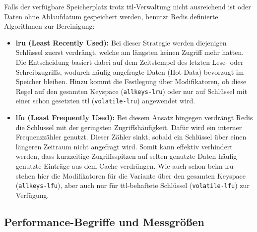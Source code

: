 Falls der verfügbare Speicherplatz trotz \ac{ttl}-Verwaltung nicht ausreichend ist oder Daten ohne Ablaufdatum gespeichert werden, benutzt Redis definierte Algorithmen zur Bereinigung:

\begin{itemize}
    \item \textbf{\ac{lru} (Least Recently Used):} Bei dieser Strategie werden diejenigen Schlüssel zuerst verdrängt, welche am längsten keinen Zugriff mehr hatten. Die Entscheidung basiert dabei auf dem Zeitstempel des letzten Lese- oder Schreibzugriffs, wodurch häufig angefragte Daten (\glqq{}Hot Data\grqq{}) bevorzugt im Speicher bleiben. Hinzu kommt die Festlegung über Modifikatoren, ob diese Regel auf den gesamten Keyspace (\texttt{allkeys-lru}) oder nur auf Schlüssel mit einer schon gesetzten \ac{ttl} (\texttt{volatile-lru}) angewendet wird.
    
    \item \textbf{\ac{lfu} (Least Frequently Used):} Bei diesem Ansatz hingegen verdrängt Redis die Schlüssel mit der geringsten Zugriffshäufigkeit. Dafür wird ein interner Frequenzzähler genutzt. Dieser Zähler sinkt, sobald ein Schlüssel über einen längeren Zeitraum nicht angefragt wird. Somit kann effektiv verhindert werden, dass kurzzeitige Zugriffsspitzen auf selten genutzte Daten häufig genutzte Einträge aus dem Cache verdrängen. Wie auch schon beim \ac{lru} stehen hier die Modifikatoren für die Variante über den gesamten Keyspace (\texttt{allkeys-lfu}), aber auch nur für \ac{ttl}-behaftete Schlüssel (\texttt{volatile-lfu}) zur Verfügung.
\end{itemize}

\subsection{Performance-Begriffe und Messgrößen}
\label{subsec:performance}

